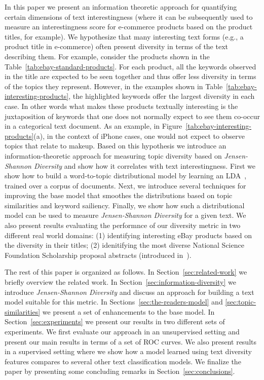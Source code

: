 In this paper we present an information theoretic approach for quantifying certain dimensions of text interestingness (where it can be subsequently used to measure an interestingness score for e-commerce products based on the product titles, for example). We hypothesize that many interesting text forms (e.g., a product title in e-commerce) often present diversity in terms of the text describing them. For example, consider the products shown in the Table~\ref{tab:ebay-standard-products}. For each product, all the keywords observed in the title are expected to be seen together and thus offer less diversity in terms of the topics they represent. However, in the examples shown in Table~\ref{tab:ebay-interesting-products}, the highlighted keywords offer the largest diversity in each case. In other words what makes these products textually interesting is the juxtaposition of keywords that one does not normally expect to see them co-occur in a categorical text document. As an example, in Figure~\ref{tab:ebay-interesting-products}(a), in the context of iPhone cases, one would not expect to observe topics that relate to makeup. Based on this hypothesis we introduce an information-theoretic approach for measuring topic diversity based on {\em Jensen-Shannon Diversity} and show how it correlates with text interestingness. First we show how to build a word-to-topic distributional model by learning an LDA~\cite{Blei:2003:LDA:944919.944937}, trained over a corpus of documents. Next, we introduce several techniques for improving the base model that smoothes the distributions based on topic similarities and keyword sailiency. Finally, we show how such a distributional model can be used to measure {\em Jensen-Shannon Diversity} for a given text. We also present results evaluating the performnce of our diversity metric in two different real world domains: (1) identifying interesting eBay products based on the diversity in their titles; (2) idenitifying the most diverse National Science Foundation Scholarship proposal abstracts (introduced in~\cite{bache:2013}). 

The rest of this paper is organized as follows. In Section~\ref{sec:related-work} we briefly overview the related work. In Section~\ref{sec:information-diversity} we introduce {\em Jensen-Shannon Diversity} and discuss an approach for building a text model suitable for this metric. In Sections~\ref{sec:the-readers-model} and \ref{sec:topic-similarities} we present a set of enhancements to the base model. In Section~\ref{sec:experiments} we present our results in two different sets of experiments. We first evaluate our approach in an unsupervised setting and present our main results in terms of a set of ROC curves. We also present results in a supervised setting where we show how a model learned using text diversity features compares to several other text classification models. We finalize the paper by presenting some concluding remarks in Section~\ref{sec:conclusions}.

